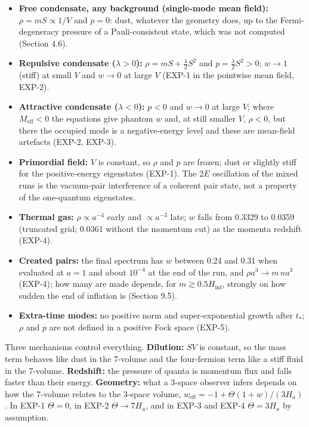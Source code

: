 \documentclass[11pt]{article}
\begin{document}
\begin{itemize}
\item \textbf{Free condensate, any background (single-mode mean field):} $\rho=mS\propto1/V$ and $p=0$: dust, whatever the geometry does, up to the Fermi-degeneracy pressure of a Pauli-consistent state, which was not computed (Section 4.6).
\item \textbf{Repulsive condensate ($\lambda>0$):} $\rho=mS+\tfrac\lambda2S^2$ and $p=\tfrac\lambda2S^2>0$; $w\to1$ (stiff) at small $V$ and $w\to0$ at large $V$ (EXP-1 in the pointwise mean field, EXP-2).
\item \textbf{Attractive condensate ($\lambda<0$):} $p<0$ and $w\to0$ at large $V$; where $M_{\mathrm{eff}}<0$ the equations give phantom $w$ and, at still smaller $V$, $\rho<0$, but there the occupied mode is a negative-energy level and these are mean-field artefacts (EXP-2, EXP-3).
\item \textbf{Primordial field:} $V$ is constant, so $\rho$ and $p$ are frozen; dust or slightly stiff for the positive-energy eigenstates (EXP-1). The $2E$ oscillation of the mixed runs is the vacuum-pair interference of a coherent pair state, not a property of the one-quantum eigenstates.
\item \textbf{Thermal gas:} $\rho\propto a^{-4}$ early and $\propto a^{-3}$ late; $w$ falls from 0.3329 to 0.0359 (truncated grid; 0.0361 without the momentum cut) as the momenta redshift (EXP-4).
\item \textbf{Created pairs:} the final spectrum has $w$ between 0.24 and 0.31 when evaluated at $a=1$ and about $10^{-4}$ at the end of the run, and $\rho a^3\to m\,na^3$ (EXP-4); how many are made depends, for $m\gtrsim0.5H_{\mathrm{inf}}$, strongly on how sudden the end of inflation is (Section 9.5).
\item \textbf{Extra-time modes:} no positive norm and super-exponential growth after $t_\ast$; $\rho$ and $p$ are not defined in a positive Fock space (EXP-5).
\end{itemize}

Three mechanisms control everything. \textbf{Dilution:} $SV$ is constant, so the mass term behaves like dust in the 7-volume and the four-fermion term like a stiff fluid in the 7-volume. \textbf{Redshift:} the pressure of quanta is momentum flux and falls faster than their energy. \textbf{Geometry:} what a 3-space observer infers depends on how the 7-volume relates to the 3-space volume, $w_{\mathrm{eff}}=-1+\Theta(1+w)/(3H_a)$. In EXP-1 $\Theta=0$, in EXP-2 $\Theta\to7H_a$, and in EXP-3 and EXP-4 $\Theta=3H_a$ by assumption.
\end{document}
